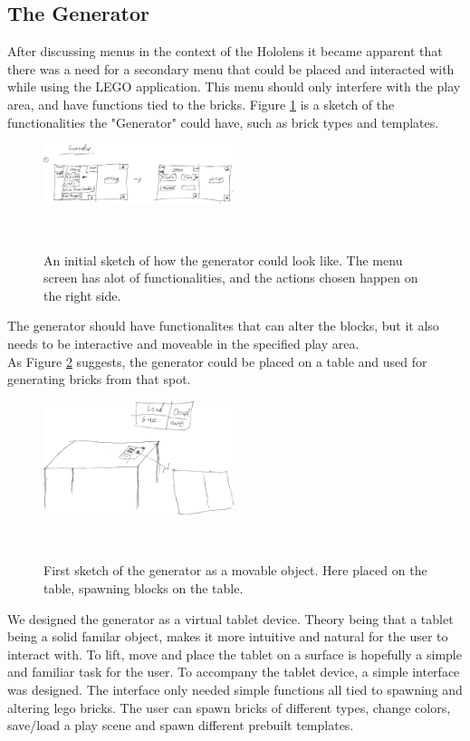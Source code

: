 \subsection{The Generator}
After discussing menus in the context of the Hololens it became apparent that there was a need for a secondary menu that could be placed and interacted with while using the LEGO application. This menu should only interfere with the play area, and have functions tied to the bricks. Figure \ref{fig:genboard1} is a sketch of the functionalities the "Generator" could have, such as brick types and templates.
\begin{figure}[t]
	\centering
	\includegraphics[width=210px]{figures/Generator/gen5_1.pdf}
	\caption{An initial sketch of how the generator could look like. The menu screen has alot of functionalities, and the actions chosen happen on the right side.}~\label{fig:genboard1}
\end{figure}
The generator should have functionalites that can alter the blocks, but it also needs to be interactive and moveable in the specified play area.\\
As Figure \ref{fig:gentablet} suggests, the generator could be placed on a table and used for generating bricks from that spot.
\begin{figure}[t]
	\centering
	\includegraphics[width=210px]{figures/Generator/gen6_1.pdf}
	\caption{First sketch of the generator as a movable object. Here placed on the table, spawning blocks on the table.}~\label{fig:gentablet}
\end{figure}
We designed the generator as a virtual tablet device. Theory being that a tablet being a solid familar object, makes it more intuitive and natural for the user to interact with. To lift, move and place the tablet on a surface is hopefully a simple and familiar task for the user. To accompany the tablet device, a simple interface was designed. The interface only needed simple functions all tied to spawning and altering lego bricks. The user can spawn bricks of different types, change colors, save/load a play scene and spawn different prebuilt templates.
